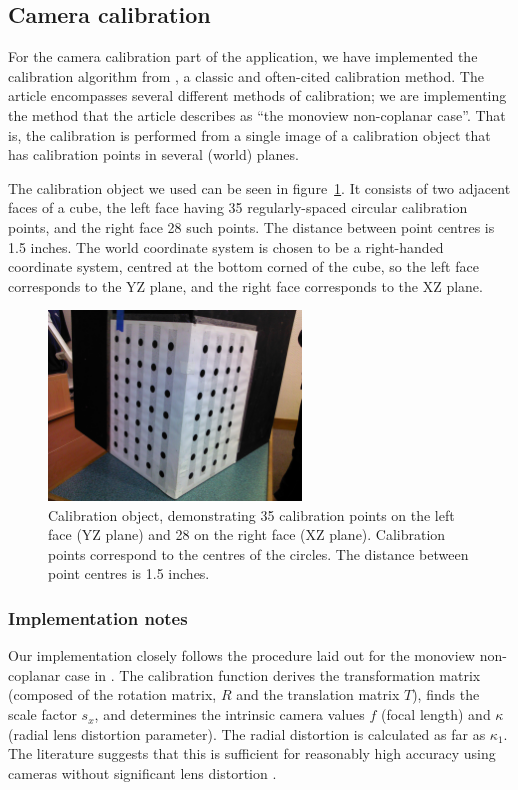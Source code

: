 
\subsection{Camera calibration}
\label{sec:calibration}

For the camera calibration part of the application, we have
implemented the calibration algorithm from \cite{TSAI}, a
classic and often-cited calibration method. The article encompasses
several different methods of calibration; we are implementing the
method that the article describes as ``the monoview non-coplanar
case''. That is, the calibration is performed from a single image
of a calibration object that has calibration points in several (world) planes.

The calibration object we used can be seen in figure~\ref{fig:calib-object}.
It consists of two adjacent faces of a cube, the left face having 35 regularly-spaced circular calibration points,
and the right face 28 such points. The distance between point centres is 1.5
inches. The world coordinate system is chosen to be a right-handed
coordinate system, centred at the bottom corned of the cube, so the
left face corresponds to the YZ plane, and the right face corresponds
to the XZ plane.

\begin{figure}[h]
  \centering
  \includegraphics[width=0.6\textwidth]{figures/calibration-object}
  \caption[Calibration object]{Calibration object, demonstrating 35 calibration points on the left face (YZ plane) and 28 on the right face (XZ plane). Calibration points correspond to the centres of the circles. The distance between point centres is 1.5 inches.}
  \label{fig:calib-object}
\end{figure}

\subsubsection{Implementation notes}
Our implementation closely follows the procedure laid out for the monoview non-coplanar case in
\cite{TSAI}. The calibration function derives
the transformation matrix (composed of the rotation matrix, $R$ and
the translation matrix $T$), finds the scale factor $s_x$, and determines the
intrinsic camera values $f$ (focal length) and $\kappa$ (radial
lens distortion parameter). The radial distortion is calculated as far as
$\kappa_1$. The literature suggests that this is sufficient for
reasonably high accuracy using cameras without significant lens
distortion \cite{algebraic-distortion}.

